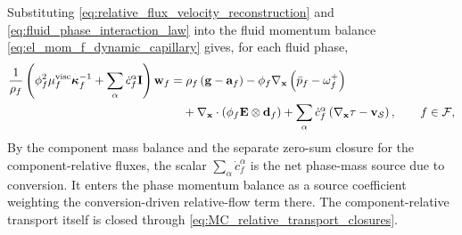 Substituting \eqref{eq:relative_flux_velocity_reconstruction} and
\eqref{eq:fluid_phase_interaction_law} into the fluid momentum balance
\eqref{eq:el_mom_f_dynamic_capillary} gives, for each fluid phase,
%
\begin{align}
	\frac{1}{\rho_f}
	\left(
		\phi_f^2\mu_f^{\mathrm{visc}}\boldsymbol{\kappa}_f^{-1}
		+\sum_\alpha\dot{c}_f^\alpha\mathbf{I}
	\right)\mathbf{w}_f
		= & \;
		\rho_f\left(\mathbf{g}-\mathbf{a}_f\right)
		-\phi_f\nabla_{\mathbf{x}}
	\left(
		\bar p_f-\omega_f^+
	\right)
		\notag \\
	  &
		+\nabla_{\mathbf{x}}\cdot
	\left(
		\phi_f\mathbf{E}\otimes\mathbf{d}_f
	\right)
		+\sum_\alpha\dot{c}_f^\alpha
	\left(\nabla_{\mathbf{x}}\tau-\mathbf{v}_{\mathcal{S}}\right),
	\qquad
	f\in\mathcal{F},
	\label{eq:relative_flux_linear_system}
\end{align}
%
By the component mass balance and the separate zero-sum closure for the
component-relative fluxes, the scalar
\(\sum_\alpha\dot{c}_f^\alpha\) is the net phase-mass source due to
conversion.  It enters the phase momentum balance as a source coefficient
weighting the conversion-driven relative-flow term there.  The
component-relative transport itself is closed through
\eqref{eq:MC_relative_transport_closures}.

